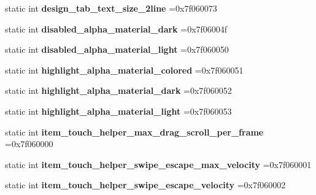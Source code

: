\begin{DoxyCompactItemize}
static int {\bfseries design\+\_\+tab\+\_\+text\+\_\+size\+\_\+2line} =0x7f060073
\item 
\mbox{\label{classandroid_1_1support_1_1v4_1_1R_1_1dimen_a2c38e806915827436e58d7a05cb31905}} 
static int {\bfseries disabled\+\_\+alpha\+\_\+material\+\_\+dark} =0x7f06004f
\item 
\mbox{\label{classandroid_1_1support_1_1v4_1_1R_1_1dimen_aa9f0384cc8c0b411400b6f8015ebc001}} 
static int {\bfseries disabled\+\_\+alpha\+\_\+material\+\_\+light} =0x7f060050
\item 
\mbox{\label{classandroid_1_1support_1_1v4_1_1R_1_1dimen_a9ad4d7afc875146d0fd0ec41ec864374}} 
static int {\bfseries highlight\+\_\+alpha\+\_\+material\+\_\+colored} =0x7f060051
\item 
\mbox{\label{classandroid_1_1support_1_1v4_1_1R_1_1dimen_a57f5d70a5fc135c741f5a2a7aedaf502}} 
static int {\bfseries highlight\+\_\+alpha\+\_\+material\+\_\+dark} =0x7f060052
\item 
\mbox{\label{classandroid_1_1support_1_1v4_1_1R_1_1dimen_ae65e9789fdabce6129196daa12f90018}} 
static int {\bfseries highlight\+\_\+alpha\+\_\+material\+\_\+light} =0x7f060053
\item 
\mbox{\label{classandroid_1_1support_1_1v4_1_1R_1_1dimen_a0600546839ba4f8e379b703cb97e75a4}} 
static int {\bfseries item\+\_\+touch\+\_\+helper\+\_\+max\+\_\+drag\+\_\+scroll\+\_\+per\+\_\+frame} =0x7f060000
\item 
\mbox{\label{classandroid_1_1support_1_1v4_1_1R_1_1dimen_a4df0345c994e91521b07fa5e8456f4d3}} 
static int {\bfseries item\+\_\+touch\+\_\+helper\+\_\+swipe\+\_\+escape\+\_\+max\+\_\+velocity} =0x7f060001
\item 
\mbox{\label{classandroid_1_1support_1_1v4_1_1R_1_1dimen_a66e94beeb06de71ce90946ac2a03fe3e}} 
static int {\bfseries item\+\_\+touch\+\_\+helper\+\_\+swipe\+\_\+escape\+\_\+velocity} =0x7f060002

\end{DoxyCompactItemize}
